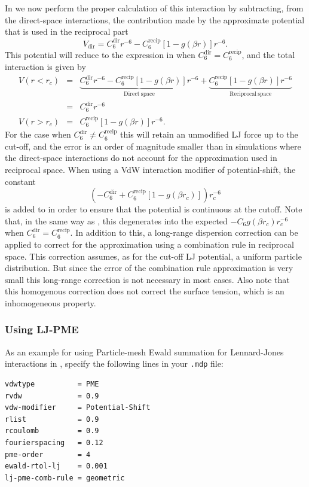 In {\gromacs} we now perform the proper calculation of this interaction
by subtracting, from the direct-space interactions, the contribution
made by the approximate potential that is used in the reciprocal part
\begin{equation}
V_\mathrm{dir} = C^{\mathrm{dir}}_6 r^{-6} - C^\mathrm{recip}_6 [1 - g(\beta r)] r^{-6}.
\label{eqn:ljpmedirectspace}
\end{equation}
This potential will reduce to the expression in  when $C^{\mathrm{dir}}_6 = C^\mathrm{recip}_6$, 
and the total interaction is given by
\begin{eqnarray}
\nonumber V(r<r_c) &=& \underbrace{C^{\mathrm{dir}}_6 r^{-6} - C^\mathrm{recip}_6 [1 - g(\beta r)] r^{-6}}_{\mathrm{Direct \  space}} + \underbrace{C^\mathrm{recip}_6 [1 - g(\beta r)] r^{-6}}_{\mathrm{Reciprocal \  space}} \\ 
&=&C^{\mathrm{dir}}_6 r^{-6}
\label {eqn:ljpmecorr2} \\
V(r>r_c) &=& C^\mathrm{recip}_6 [1 - g(\beta r)] r^{-6}.
\end{eqnarray}
For the case when $C^{\mathrm{dir}}_6 \neq C^\mathrm{recip}_6$ this
will retain an unmodified LJ force up to the cut-off, and the error
is an order of magnitude smaller than in simulations where the
direct-space interactions do not account for the approximation used in
reciprocal space. When using a VdW interaction modifier of
potential-shift, the constant
\begin{equation}
\left(-C^{\mathrm{dir}}_6 + C^\mathrm{recip}_6 [1 - g(\beta r_c)]\right) r_c^{-6}
\end{equation}
is added to  in order to ensure that the potential
is continuous at the cutoff. Note that, in the same way as , this degenerates into the
expected $-C_6g(\beta r_c)r^{-6}_c$ when $C^{\mathrm{dir}}_6 =
C^\mathrm{recip}_6$. In addition to this, a long-range dispersion
correction can be applied to correct for the approximation using a
combination rule in reciprocal space. This correction assumes, as for
the cut-off LJ potential, a uniform particle distribution.  But since
the error of the combination rule approximation is very small this
long-range correction is not necessary in most cases. Also note that
this homogenous correction does not correct the surface tension, which
is an inhomogeneous property.

\subsubsection{Using LJ-PME}
As an example for using Particle-mesh Ewald summation for Lennard-Jones interactions in {\gromacs}, specify the
following lines in your {\tt .mdp} file:
\begin{verbatim}
vdwtype          = PME
rvdw             = 0.9
vdw-modifier     = Potential-Shift
rlist            = 0.9
rcoulomb         = 0.9
fourierspacing   = 0.12
pme-order        = 4
ewald-rtol-lj    = 0.001
lj-pme-comb-rule = geometric
\end{verbatim}


